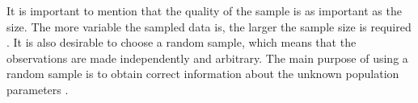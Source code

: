It is important to mention that the quality of the sample is as important as the size. The more variable the sampled data is, the larger the sample size is required \citep{Israel1992}. It is also desirable to choose a random sample, which means that the observations are made independently and arbitrary. The main purpose of using a random sample is to obtain correct information about the unknown population parameters \citep{Walpole2012}. 




